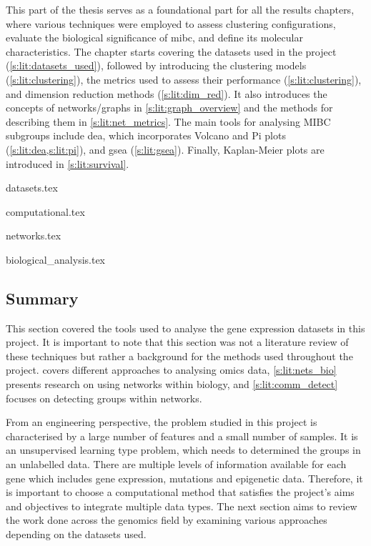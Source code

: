This part of the thesis serves as a foundational part for all the results chapters, where various techniques were employed to assess clustering configurations, evaluate the biological significance of \acrshort{mibc}, and define its molecular characteristics. The chapter starts covering the datasets used in the project (\cref{s:lit:datasets_used}), followed by introducing the clustering models (\cref{s:lit:clustering}), the metrics used to assess their performance (\cref{s:lit:clustering}), and dimension reduction methods (\cref{s:lit:dim_red}). It also introduces the concepts of networks/graphs in \cref{s:lit:graph_overview} and the methods for describing them in \cref{s:lit:net_metrics}. The main tools for analysing MIBC subgroups include \acrfull{dea}, which incorporates Volcano and Pi plots (\cref{s:lit:dea,s:lit:pi}), and \acrfull{gsea} (\cref{s:lit:gsea}). Finally, Kaplan-Meier plots are introduced in \cref{s:lit:survival}.



{datasets.tex}

{computational.tex}

{networks.tex}

{biological_analysis.tex}



\subsection{Summary} \label{s:lit:choosing_ml}


This section covered the tools used to analyse the gene expression datasets in this project. It is important to note that this section was not a literature review of these techniques but rather a background for the methods used throughout the project.  covers different approaches to analysing omics data, \cref{s:lit:nets_bio} presents research on using networks within biology, and \cref{s:lit:comm_detect} focuses on detecting groups within networks.

From an engineering perspective, the problem studied in this project is characterised by a large number of features and a small number of samples. It is an unsupervised learning type problem, which needs to determined the groups in an unlabelled data. There are multiple levels of information available for each gene which includes gene expression, mutations and epigenetic data. Therefore, it is important to choose a computational method that satisfies the project's aims and objectives to integrate multiple data types. The next section aims to review the work done across the genomics field by examining various approaches depending on the datasets used.
